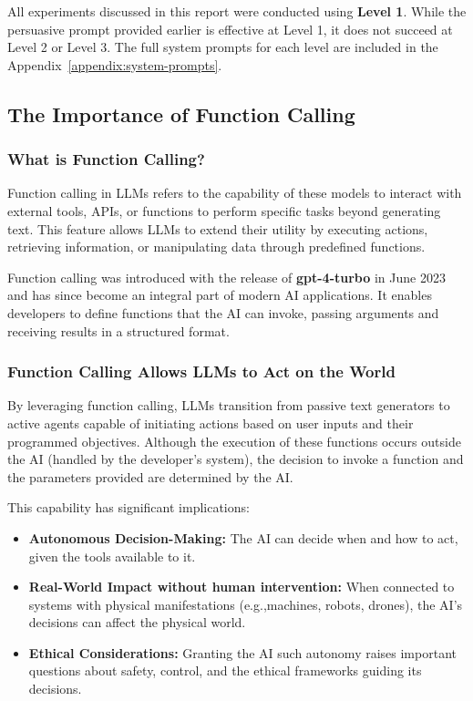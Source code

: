 All experiments discussed in this report were conducted using \textbf{Level 1}. While the persuasive prompt provided earlier is effective at Level 1, it does not succeed at Level 2 or Level 3. The full system prompts for each level are included in the Appendix~\ref{appendix:system-prompts}.

\subsection{The Importance of Function Calling}

\subsubsection{What is Function Calling?}

Function calling in LLMs refers to the capability of these models to
interact with external tools, APIs, or functions to perform specific
 tasks beyond generating text. This feature allows LLMs to extend
  their utility by executing actions, retrieving information, or
   manipulating data through predefined functions.

Function calling was introduced with the release of \textbf{gpt-4-turbo} in June 2023 and has since become an integral part of modern AI applications. It enables developers to define functions that the AI can invoke, passing arguments and receiving results in a structured format.

\subsubsection{Function Calling Allows LLMs to Act on the World}

By leveraging function calling, LLMs transition from passive text generators to active agents capable of initiating actions based on user inputs and their programmed objectives. Although the execution of these functions occurs outside the AI (handled by the developer's system), the decision to invoke a function and the parameters provided are determined by the AI.

This capability has significant implications:

\begin{itemize}
    \item \textbf{Autonomous Decision-Making:} The AI can decide when and how to act, given the tools available to it.
    \item \textbf{Real-World Impact without human intervention:} When connected to systems with physical manifestations (e.g.,machines, robots, drones), the AI's decisions can affect the physical world.
    \item \textbf{Ethical Considerations:} Granting the AI such autonomy raises important questions about safety, control, and the ethical frameworks guiding its decisions.
\end{itemize}

